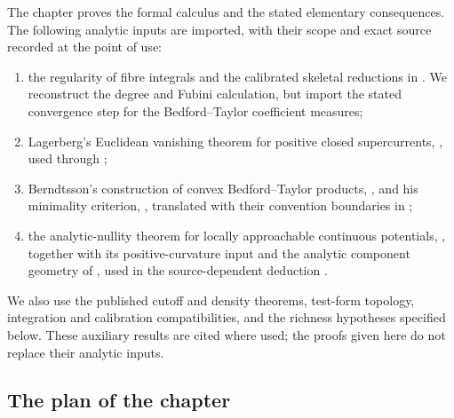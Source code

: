 The chapter proves the formal calculus and the stated elementary
consequences. The following analytic inputs are imported, with their
scope and exact source recorded at the point of use:
\begin{enumerate}
\item the regularity of fibre integrals and the calibrated skeletal
  reductions in \cite[Theorem~16.3.3, Lemma~14.2.10 and
  Theorems~16.5.4--16.5.7]{CLD25}. We reconstruct the degree and Fubini
  calculation, but import the stated convergence step for the
  Bedford--Taylor coefficient measures;
\item Lagerberg's Euclidean vanishing theorem for positive closed
  supercurrents, \cite[Corollary~4.1]{Lag12Super}, used through
  \cite[Theorem~16.8.5]{CLD25};
\item Berndtsson's construction of convex Bedford--Taylor products,
  \cite[Theorem~4.2]{Ber26Convex}, and his minimality criterion,
  \cite[Corollary~5.2]{Ber19Super}, translated with their convention
  boundaries in ;
\item the analytic-nullity theorem for locally approachable continuous
  potentials, \cite[Corollary~16.9.4]{CLD25}, together with its
  positive-curvature input \cite[Lemma~8.5.5]{CLD25} and the analytic
  component geometry of \cite[Theorem~4.20]{Ducros09Excellence}, used in
  the source-dependent deduction
  .

\end{enumerate}
We also use the published cutoff and density theorems, test-form topology,
integration and calibration compatibilities, and the richness hypotheses
specified below. These auxiliary results are cited where used; the proofs
given here do not replace their analytic inputs.

\subsection{The plan of the chapter}
\label{sec:ch14-plan}

